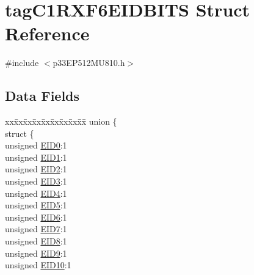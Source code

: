 \hypertarget{structtag_c1_r_x_f6_e_i_d_b_i_t_s}{}\section{tag\+C1\+R\+X\+F6\+E\+I\+D\+B\+I\+TS Struct Reference}
\label{structtag_c1_r_x_f6_e_i_d_b_i_t_s}


{\ttfamily \#include $<$p33\+E\+P512\+M\+U810.\+h$>$}

\subsection*{Data Fields}
\begin{DoxyCompactItemize}
\item 
\begin{tabbing}
xx\=xx\=xx\=xx\=xx\=xx\=xx\=xx\=xx\=\kill
union \{\\
\>struct \{\\
\>\>unsigned \hyperlink{structtag_c1_r_x_f6_e_i_d_b_i_t_s_a9da8b7b30247e4f9cd8cc056549aa9fd}{EID0}:1\\
\>\>unsigned \hyperlink{structtag_c1_r_x_f6_e_i_d_b_i_t_s_afd6c139491d147c1262f3d051c6691e9}{EID1}:1\\
\>\>unsigned \hyperlink{structtag_c1_r_x_f6_e_i_d_b_i_t_s_a36ec62d8d3c5acd5d15e6691dc099a94}{EID2}:1\\
\>\>unsigned \hyperlink{structtag_c1_r_x_f6_e_i_d_b_i_t_s_ab895f7d0ac289a0383b607cbc62eebe2}{EID3}:1\\
\>\>unsigned \hyperlink{structtag_c1_r_x_f6_e_i_d_b_i_t_s_a136d5a709d6618d40acceccb43036656}{EID4}:1\\
\>\>unsigned \hyperlink{structtag_c1_r_x_f6_e_i_d_b_i_t_s_a8dffb2d86a6c184df505ae7c71a58710}{EID5}:1\\
\>\>unsigned \hyperlink{structtag_c1_r_x_f6_e_i_d_b_i_t_s_af8a8574102515d8f1a4b7fd1685d0532}{EID6}:1\\
\>\>unsigned \hyperlink{structtag_c1_r_x_f6_e_i_d_b_i_t_s_a84c3262e67f8d5fd387ac10bde6fa9b1}{EID7}:1\\
\>\>unsigned \hyperlink{structtag_c1_r_x_f6_e_i_d_b_i_t_s_acca25e0b7d86eb499d01f85222baea87}{EID8}:1\\
\>\>unsigned \hyperlink{structtag_c1_r_x_f6_e_i_d_b_i_t_s_ac6748f73d4ada8538b06548be4f396c2}{EID9}:1\\
\>\>unsigned \hyperlink{structtag_c1_r_x_f6_e_i_d_b_i_t_s_a9cea8e77ecbb72bd3b08102412793725}{EID10}:1\\

\end{tabbing}
\end{DoxyCompactItemize}
